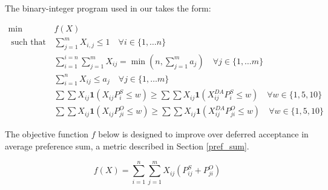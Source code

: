 The binary-integer program used in our takes the form:

\begin{align}
\min \qquad &  f(X) \label{obj_func}\\
\text{ such that } \qquad & \sum_{j=1}^m X_{i,j} \leq 1 \quad  \forall i \in \{1, \dots n\} \label{one_job}\\
& \sum_{i = 1}^{i=n} \sum_{j = 1}^{m}X_{ij} = \min \left(n,\sum_{j = 1}^{m}a_j \right) \quad  \forall j \in \{1, \dots m\}  \label{all_filled}\\
& \sum_{i=1}^n X_{ij} \leq a_j \quad  \forall j \in \{1, \dots m\} \label{capacity} \\
& \sum \sum X_{ij}\mathbf{1}(X_{ij} P^S_{i} \leq w) \geq \sum \sum X_{ij}\mathbf{1}(X^{DA}_{ij} P^S_{i} \leq w) \quad \forall w \in \{1,5,10\} \label{s_da}\\ 
& \sum \sum X_{ij}\mathbf{1}(X_{ij} P^O_{ji} \leq w) \geq \sum \sum X_{ij}\mathbf{1}(X^{DA}_{ij} P^O_{ji} \leq w) \quad \forall w \in \{1,5,10\} \label{o_da}
\end{align}

The objective function $f$ below is designed to improve over deferred acceptance in average preference sum, a metric described in Section \ref{pref_sum}. 

\[f(X) = \sum_{i=1}^n \sum_{j=1}^m X_{ij}(P^S_{ij} + P^O_{ji})\]
